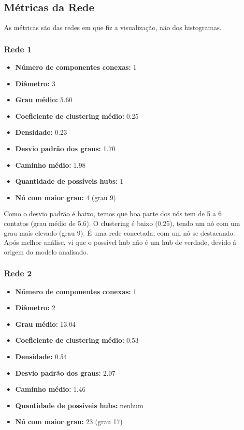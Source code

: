 \documentclass[a4paper]{article}
\begin{document}
\subsection*{Métricas da Rede}

As métricas são das redes em que fiz a visualização, não dos histogramas.
\subsubsection{Rede 1}
\begin{itemize}
    \item \textbf{Número de componentes conexas:} 1
    \item \textbf{Diâmetro:} 3
    \item \textbf{Grau médio:} 5.60
    \item \textbf{Coeficiente de clustering médio:} 0.25
    \item \textbf{Densidade:} 0.23
    \item \textbf{Desvio padrão dos graus:} 1.70
    \item \textbf{Caminho médio:} 1.98
    \item \textbf{Quantidade de possíveis hubs:} 1
    \item \textbf{Nó com maior grau:} 4 (grau 9)
\end{itemize}

Como o desvio padrão é baixo, temos que boa parte dos nós tem de 5 a 6 contatos (grau médio de 5.6). O clustering é baixo (0.25), tendo um nó com um grau mais elevado (grau 9). É uma rede conectada, com um nó se destacando. Após melhor análise, vi que o possível hub não é um hub de verdade, devido à origem do modelo analisado.

\subsubsection{Rede 2}
\begin{itemize}
    \item \textbf{Número de componentes conexas:} 1
    \item \textbf{Diâmetro:} 2
    \item \textbf{Grau médio:} 13.04
    \item \textbf{Coeficiente de clustering médio:} 0.53
    \item \textbf{Densidade:} 0.54
    \item \textbf{Desvio padrão dos graus:} 2.07
    \item \textbf{Caminho médio:} 1.46
    \item \textbf{Quantidade de possíveis hubs:} nenhum
    \item \textbf{Nó com maior grau:} 23 (grau 17)
\end{itemize}
\end{document}
